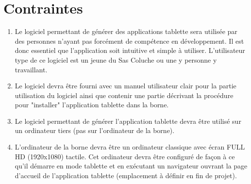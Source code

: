 \documentclass[11pt]{article}
\begin{document}
\section{Contraintes}
\begin{enumerate}
\item Le logiciel permettant de générer des applications tablette sera utilisée par des personnes n'ayant pas forcément de compétence en développement. Il est donc essentiel que l'application soit intuitive et simple à utiliser. L'utilisateur type de ce logiciel est un jeune du Sas Coluche ou une y personne y travaillant.
\item Le logiciel devra être fourni avec un manuel utilisateur clair pour la partie utilisation du logiciel ainsi que contenir une partie décrivant la procédure pour "installer" l'application tablette dans la borne.
\item Le logiciel permettant de générer l'application tablette devra être utilisé sur un ordinateur tiers (pas sur l'ordinateur de la borne).
\item L'ordinateur de la borne devra être un ordinateur classique avec écran FULL HD (1920x1080) tactile. Cet ordinateur devra être configuré de façon à ce qu'il démarre en mode tablette et en exécutant un navigateur ouvrant la page d'accueil de l'application tablette (emplacement à définir en fin de projet).
\end{enumerate}
\end{document}
